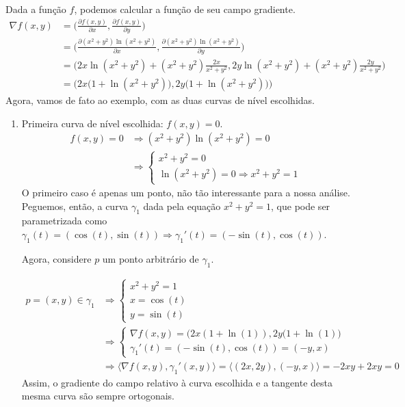 \documentclass[../main.tex]{subfiles}
\begin{document}
		\begin{solucao}
			Dada a função $f$, podemos calcular a função de seu campo gradiente.
			\begin{align*}
				\nabla f(x,y)
				&=\bigg(\frac{\partial f(x,y)}{\partial x}, \frac{\partial f(x,y)}{\partial y}\bigg)\\
				&=\bigg(\frac{\partial (x^2+y^2)\ln(x^2+y^2)}{\partial x}, \frac{\partial (x^2+y^2)\ln(x^2+y^2)}{\partial y}\bigg)\\
				&=\bigg(2x\ln(x^2+y^2)+(x^2+y^2)\frac{2x}{x^2+y^2}, 2y \ln(x^2+y^2)+(x^2+y^2)\frac{2y}{x^2+y^2}\bigg)\\
				&=\bigg(2x\big(1+\ln(x^2+y^2)\big), 2y\big(1+\ln(x^2+y^2)\big)\bigg)
			\end{align*}
			Agora, vamos de fato ao exemplo, com as duas curvas de nível escolhidas.
			\begin{enumerate}
				\item Primeira curva de nível escolhida: $f(x,y)=0$.
				\begin{align*}
					f(x,y)=0
					&\Rightarrow(x^2+y^2)\ln(x^2+y^2)=0\\
					&\Rightarrow \begin{cases}x^2+y^2=0\\ \ln(x^2+y^2)=0\Rightarrow x^2+y^2=1\end{cases}
				\end{align*}
				O primeiro caso é apenas um ponto, não tão interessante para a nossa análise. Peguemos, então, a curva $\gamma_1$ dada pela equação $x^2+y^2=1$, que pode ser parametrizada como $\gamma_1(t)=(\cos(t), \sin(t))\Rightarrow \gamma_1'(t)=(-\sin(t),\cos(t))$.
				
				Agora, considere $p$ um ponto arbitrário de $\gamma_1$.
				
				\begin{align*}
					p=(x,y)\in\gamma_1
					&\Rightarrow\begin{cases}x^2+y^2=1\\x=\cos(t)\\y=\sin(t)\end{cases}\\
					&\Rightarrow\begin{cases}\nabla f(x,y)=\bigg(2x(1+\ln(1)), 2y(1+\ln(1)\bigg)\\ \gamma_1'(t)=(-\sin(t), \cos(t))=(-y,x)\end{cases}\\
					&\Rightarrow\langle \nabla f(x,y),\gamma_1'(x,y)\rangle=\langle(2x,2y),(-y,x)\rangle=-2xy+2xy=0
				\end{align*}
				Assim, o gradiente do campo relativo à curva escolhida e a tangente desta mesma curva são sempre ortogonais.
				

\end{enumerate}
\end{solucao}
\end{document}
